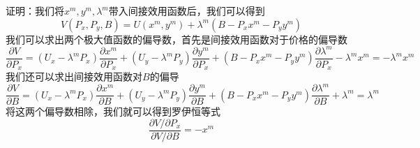 \documentclass[UTF8,12pt]{ctexart}
\numberwithin{equation}{section} %
\numberwithin{figure}{section}
\numberwithin{table}{section}
\begin{document}
	证明：我们将$x^m,y^m,\lambda^m$带入间接效用函数后，我们可以得到
	\begin{equation}
		V(P_x,P_y,B) = U(x^m,y^m) + \lambda^m(B - P_xx^m - P_yy^m)
	\end{equation}
	我们可以求出两个极大值函数的偏导数，首先是间接效用函数对于价格的偏导数
	\begin{equation}
		\frac{\partial V}{\partial P_x} = 
		(U_x - \lambda^mP_x)\frac{\partial x^m}{\partial P_x} + (U_y - \lambda^mP_y)\frac{\partial y^m}{\partial P_x} + (B - P_xx^m - P_yy^m)\frac{\partial \lambda^m}{\partial P_x} - \lambda^mx^m = - \lambda^mx^m
	\end{equation}
	我们还可以求出间接效用函数对$B$的偏导
	\begin{equation}
		\frac{\partial V}{\partial B} = 
		(U_x - \lambda^mP_x)\frac{\partial x^m}{\partial B} + (U_y - \lambda^mP_y)\frac{\partial y^m}{\partial B} + (B - P_xx^m - P_yy^m)\frac{\partial \lambda^m}{\partial B} + \lambda^m =  \lambda^m
	\end{equation}
	将这两个偏导数相除，我们就可以得到罗伊恒等式
	\begin{equation}
		\frac{\partial V/\partial P_x}{\partial V/\partial B} = -x^m
	\end{equation}
	
\end{document}
